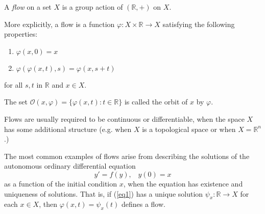 \documentclass[12pt]{article}
\begin{document}
A \emph{flow} on a set $X$ is a group action of $(\mathbb{R},+)$ on $X$.

More explicitly, a flow is a function 
$\varphi:X\times \mathbb{R}\rightarrow X$
satisfying the following properties:
\begin{enumerate}
\item $\varphi(x,0) = x$ 
\item $\varphi(\varphi(x,t),s) = \varphi(x,s+t)$
\end{enumerate}
for all $s,t$ in $\mathbb{R}$ and $x\in X$.

The set $\mathcal{O}(x,\varphi) = \{\varphi(x,t):t\in\mathbb{R}\}$ is called the orbit of $x$ by $\varphi$.

Flows are usually required to be continuous or   differentiable, when the space $X$ has some additional structure (e.g. when $X$ is a topological space or when $X = \mathbb{R}^n$.)

The most common examples of flows arise from describing the solutions of the autonomous ordinary differential equation 
\begin{equation}\label{eq1} y' = f(y),\;\;\; y(0)=x \end{equation}
as a function of the initial condition $x$, when the equation has existence and uniqueness of solutions.
That is, if (\ref{eq1}) has a unique solution $\psi_x:\mathbb{R}\rightarrow X$ for each $x\in X$, then $\varphi(x,t) = \psi_x(t)$ defines a flow.
\end{document}
